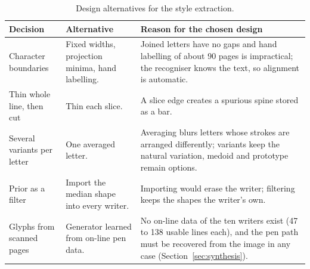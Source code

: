 \begin{table}[!htbp]
\centering
\fontsize{9.5}{11.5}\selectfont
\begin{tabularx}{\linewidth}{|p{3.0cm}|X|X|}
\hline
\textbf{Decision} & \textbf{Alternative} & \textbf{Reason for the chosen design} \\
\hline
Character boundaries & Fixed widths, projection minima, hand labelling. & Joined letters have no gaps and hand labelling of about 90 pages is impractical; the recogniser knows the text, so alignment is automatic. \\
\hline
Thin whole line, then cut & Thin each slice. & A slice edge creates a spurious spine stored as a bar. \\
\hline
Several variants per letter & One averaged letter. & Averaging blurs letters whose strokes are arranged differently; variants keep the natural variation, medoid and prototype remain options. \\
\hline
Prior as a filter & Import the median shape into every writer. & Importing would erase the writer; filtering keeps the shapes the writer's own. \\
\hline
Glyphs from scanned pages & Generator learned from on-line pen data. & No on-line data of the ten writers exist (47 to 138 usable lines each), and the pen path must be recovered from the image in any case (Section~\ref{sec:synthesis}). \\
\hline
\end{tabularx}
\caption{Design alternatives for the style extraction.}
\label{tab:sty-alt}
\end{table}

